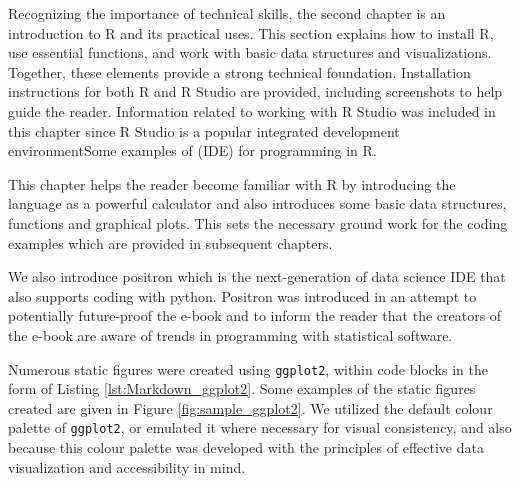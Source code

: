 \documentclass[11pt]{article}
\begin{document}
Recognizing the importance of technical skills, the second chapter is an introduction to R and its practical uses. 
This section explains how to install R, use essential functions, and work with basic data structures and visualizations. 
Together, these elements provide a strong technical foundation. 
Installation instructions for both R and R Studio are provided, including screenshots to help guide the reader.
Information related to working with R Studio was included in this chapter since R Studio is a popular integrated development environmentSome examples of (IDE) for programming in R.

This chapter helps the reader become familiar with R by introducing the language as a powerful calculator and also introduces some basic data structures, functions and graphical plots.
This sets the necessary ground work for the coding examples which are provided in subsequent chapters.

We also introduce positron which is the next-generation of data science IDE that also supports coding with python.
Positron was introduced in an attempt to potentially future-proof the e-book and to inform the reader that the creators of the e-book are aware of trends in programming with statistical software.

Numerous static figures were created using \texttt{ggplot2}, within code blocks in the form of Listing \ref{lst:Markdown_ggplot2}.
Some examples of the static figures created are given in Figure \ref{fig:sample_ggplot2}.
We utilized the default colour palette of \texttt{ggplot2}, or emulated it where necessary for visual consistency,
and also because this colour palette was developed with the principles of effective data visualization and accessibility in mind.

\end{document}
